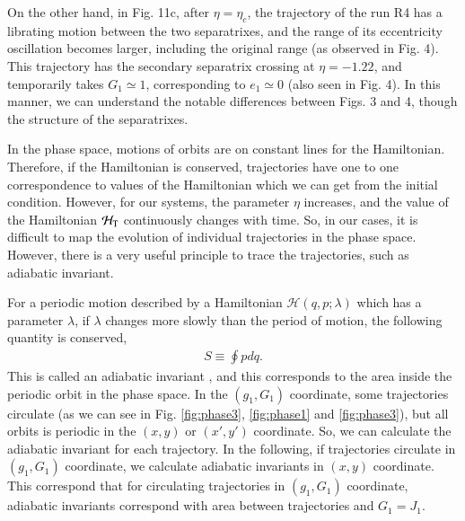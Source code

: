 \documentclass[useAMS,usenatbib,twocolumn]{mn2e}
\newcommand{\beqa}{\begin{eqnarray}}
\newcommand{\eeqa}{\end{eqnarray}}
\begin{document}
On the other hand, in Fig. 11c,  after $\eta=\eta_c$, the trajectory of the run R4  has a librating motion between the two separatrixes, and the range of its eccentricity oscillation becomes larger, including the original range (as observed in Fig. 4).  
This trajectory has the secondary separatrix crossing at $\eta=-1.22$, and temporarily takes  $G_1 \simeq 1$, corresponding to $e_1\simeq 0$ (also seen in  Fig. 4). 
 In this manner, we can understand the notable differences between Figs. 3 and 4, though the structure of the separatrixes.


In the phase space, motions of orbits are on constant lines for the Hamiltonian.
Therefore, if the Hamiltonian is conserved, trajectories have one to one correspondence to values of the Hamiltonian which we can get from the initial condition.
However, for our systems, the parameter $\eta$ increases, and the value of the Hamiltonian $\mathcal{H}_{\rm T}$ continuously changes with time.
So, in our cases, it is difficult to map the evolution of individual trajectories in the phase space.
However, there is a very useful principle to trace the
trajectories, such as adiabatic invariant.



For a periodic motion described by a Hamiltonian
$\mathcal{H}(q,p;\lambda)$ which has a parameter $\lambda$, if
$\lambda$ changes more slowly than the period of motion, the
following quantity is conserved,
\beqa
S\equiv\oint p dq.
\eeqa
This is called an adiabatic invariant
\citep{landau1969}, and this corresponds to the area
inside the periodic orbit in the phase space. In the $(g_1, G_1)$ coordinate, some
trajectories circulate (as we can see in Fig. \ref{fig:phase3},  \ref{fig:phase1} and \ref{fig:phase3}), 
but all orbits is periodic in the $(x,y)$
or $(x',y')$ coordinate. So, we can calculate the adiabatic
invariant for each trajectory. In the following, if trajectories circulate in $(g_1, G_1)$ coordinate, we calculate adiabatic invariants 
in $(x,y)$ coordinate. This correspond that for circulating trajectories in $(g_1,G_1)$ coordinate, adiabatic invariants correspond 
with area between trajectories and $G_{1}=J_{1}$.
\end{document}
